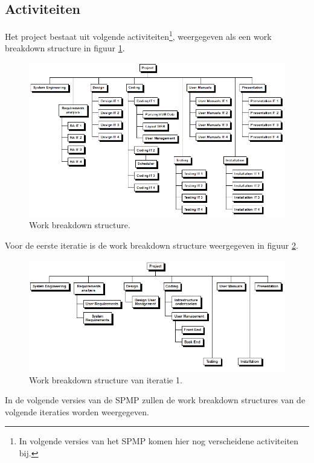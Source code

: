 \subsection{Activiteiten}
Het project bestaat uit volgende activiteiten\footnote{In volgende versies van het SPMP komen hier nog verscheidene activiteiten bij.}, weergegeven als een work breakdown structure in figuur \ref{fig:workbreakdownstructure}.
\begin{figure} [H]
    \centering
    \includegraphics[width = \textwidth]{ManagerialProcess/WBSChart.png}
    \caption{Work breakdown structure.}
	\label{fig:workbreakdownstructure}
\end{figure}
Voor de eerste iteratie is de work breakdown structure weergegeven in figuur \ref{fig:wbsIteratie1}.
\begin{figure} [H]
	\centering
	\includegraphics[width = \textwidth]{ManagerialProcess/WBSChartIteratie1.png}
	\caption{Work breakdown structure van iteratie 1.}
	\label{fig:wbsIteratie1}
\end{figure}
In de volgende versies van de SPMP zullen de work breakdown structures van de volgende iteraties worden weergegeven.
